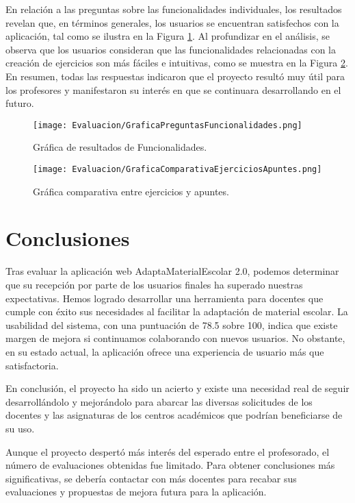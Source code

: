 En relación a las preguntas sobre las funcionalidades individuales, los resultados revelan que, en términos generales, los usuarios se encuentran satisfechos con la aplicación, tal como se ilustra en la Figura \ref{fig:graficaPreguntasFuncionalidades}. Al profundizar en el análisis, se observa que los usuarios consideran que las funcionalidades relacionadas con la creación de ejercicios son más fáciles e intuitivas, como se muestra en la Figura \ref{fig:graficaComparativaEjerciciosApuntes}. En resumen, todas las respuestas indicaron que el proyecto resultó muy útil para los profesores y manifestaron su interés en que se continuara desarrollando en el futuro.

\begin{figure}[H]
    \centering
    \texttt{[image: Evaluacion/GraficaPreguntasFuncionalidades.png]}
    \caption{Gráfica de resultados de Funcionalidades.}
    \label{fig:graficaPreguntasFuncionalidades}
\end{figure}

\begin{figure}[H]
    \centering
    \texttt{[image: Evaluacion/GraficaComparativaEjerciciosApuntes.png]}
    \caption{Gráfica comparativa entre ejercicios y apuntes.}
    \label{fig:graficaComparativaEjerciciosApuntes}
\end{figure}

\section{Conclusiones}\label{sec:conclusionesEvaluacion}
Tras evaluar la aplicación web AdaptaMaterialEscolar 2.0, podemos determinar que su recepción por parte de los usuarios finales ha superado nuestras expectativas. Hemos logrado desarrollar una herramienta para docentes que cumple con éxito sus necesidades al facilitar la adaptación de material escolar. La usabilidad del sistema, con una puntuación de 78.5 sobre 100, indica que existe margen de mejora si continuamos colaborando con nuevos usuarios. No obstante, en su estado actual, la aplicación ofrece una experiencia de usuario más que satisfactoria.

En conclusión, el proyecto ha sido un acierto y existe una necesidad real de seguir desarrollándolo y mejorándolo para abarcar las diversas solicitudes de los docentes y las asignaturas de los centros académicos que podrían beneficiarse de su uso.

Aunque el proyecto despertó más interés del esperado entre el profesorado, el número de evaluaciones obtenidas fue limitado. Para obtener conclusiones más significativas, se debería contactar con más docentes para recabar sus evaluaciones y propuestas de mejora futura para la aplicación.
